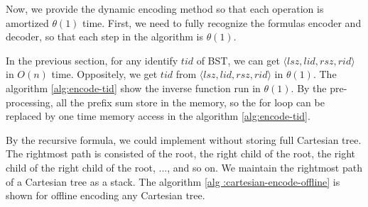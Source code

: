 \iffalse
ISMQ 已知解法有二，其一使用並查集在 $O(\alpha(n))$ 解決單一操作，
其二使用樸素的稀疏表在 $O(\log n)$完成插入操作、$O(1)$ 完成詢問操作。
其二，Fischer \cite{fischer} 提出的 $\theta(n)$ -- $\theta(1)$ 無法應用在此，
其原因在於插入元素時，無法動態決定 in-block 的最大值，必須等到整個 in-block 塞滿至預設值才可解決。

在我們的應用中維護後綴最大值，
拓展其操作成為增長區間最大值查找 (\emph{incremental range maximum query}, IRMQ)，
其支援兩項操作：
\fi

Now, we provide the dynamic encoding method so that each operation is
amortized $\theta(1)$ time.  First, we need to fully recognize the
formulas encoder and decoder, so that each step in the algorithm is
$\theta(1)$.

In the previous section, for any identify $\mathit{tid}$ of BST, we
can get
$\langle\mathit{lsz},\mathit{lid},\mathit{rsz},\mathit{rid}\rangle$ in
$O(n)$ time.  Oppositely, we get $\mathit{tid}$ from
$\langle\mathit{lsz},\mathit{lid},\mathit{rsz},\mathit{rid}\rangle$ in
$\theta(1)$.  The algorithm \ref{alg:encode-tid} show the inverse
function run in $\theta(1)$.  By the pre-processing, all the prefix
sum store in the memory, so the for loop can be replaced by one time
memory access in the algorithm \ref{alg:encode-tid}.

\iffalse
接下來的幾段中，我們提供動態的編碼方式使得每一操作皆均攤 $\theta(1)$ 完成。首先，我們需要充分認知編碼相互轉換的公式，藉以在算法中完成每一步皆為 $\theta(1)$ 的要求。

在上一節提出對於任意編號 $\mathit{tid}$ 可以在 $O(n)$ 時間內得到 $\langle\mathit{lsz},\mathit{lid},\mathit{rsz},\mathit{rid}\rangle$；
相反地，可以在 $\theta(1)$ 時間內逆推得到 $\mathit{tid}$，如算法 ~\ref{alg:encode-tid}。
透過預處理，事先將所有前綴和保存下來，在算法中的迴圈可視為一次內存存取，使得時間複雜度 $\theta(1)$。
\fi



By the recursive formula,  we could implement without storing full
Cartesian tree.  The rightmost path is consisted of the root, the
right child of the root, the right child of the right child of the
root, ..., and so on.  We maintain the rightmost path of a Cartesian
tree as a stack.  The algorithm \ref{alg :cartesian-encode-offline} is
shown for offline encoding any Cartesian tree.

\iffalse
根據先前的字典順序編碼，只需要維護笛卡爾樹的右鏈，實作上與堆疊結構相同。
基於 row-major 順序和遞迴定義 ~\ref{fun:LCA}，修改之前論文對於的離線編碼，
其對應方案如算法 \ref{alg:cartesian-encode-offline}。
\fi

